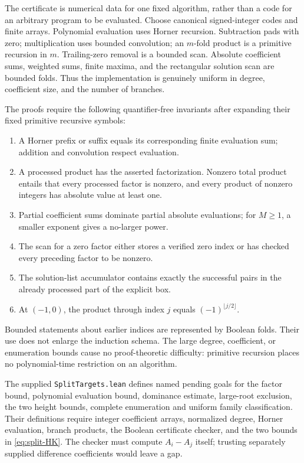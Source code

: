 The certificate is numerical data for one fixed algorithm, rather than
a code for an arbitrary program to be evaluated.  Choose canonical
signed-integer codes and finite arrays.  Polynomial evaluation uses
Horner recursion.  Subtraction pads with zero; multiplication uses bounded
convolution; an \(m\)-fold product is a primitive recursion in \(m\).
Trailing-zero removal is a bounded scan.  Absolute coefficient sums,
weighted sums, finite maxima, and the rectangular solution scan are
bounded folds.  Thus the implementation is genuinely uniform in degree,
coefficient size, and the number of branches.

The proofs require the following quantifier-free invariants after
expanding their fixed primitive recursive symbols:
\begin{enumerate}
 \item A Horner prefix or suffix equals its corresponding finite
       evaluation sum; addition and convolution respect evaluation.
 \item A processed product has the asserted factorization.  Nonzero
       total product entails that every processed factor is nonzero,
       and every product of nonzero integers has absolute value at
       least one.
 \item Partial coefficient sums dominate partial absolute evaluations;
       for \(M\geq1\), a smaller exponent gives a no-larger power.
 \item The scan for a zero factor either stores a verified zero index
       or has checked every preceding factor to be nonzero.
 \item The solution-list accumulator contains exactly the successful
       pairs in the already processed part of the explicit box.
 \item At \((-1,0)\), the product through index \(j\) equals
       \((-1)^{\lfloor j/2\rfloor}\).
\end{enumerate}
Bounded statements about earlier indices are represented by Boolean
folds.  Their use does not enlarge the induction schema.
The large degree, coefficient, or enumeration bounds cause no
proof-theoretic difficulty: primitive recursion places no polynomial-time
restriction on an algorithm.

The supplied \texttt{SplitTargets.lean} defines named pending goals for
the factor bound, polynomial evaluation bound, dominance estimate, large-root
exclusion, the two height bounds, complete enumeration and uniform family
classification. Their definitions require integer coefficient arrays, normalized degree,
Horner evaluation, branch products, the Boolean certificate checker,
and the two bounds in \eqref{eq:split-HK}.  The checker must compute
\(A_i-A_j\) itself; trusting separately supplied difference coefficients
would leave a gap.

